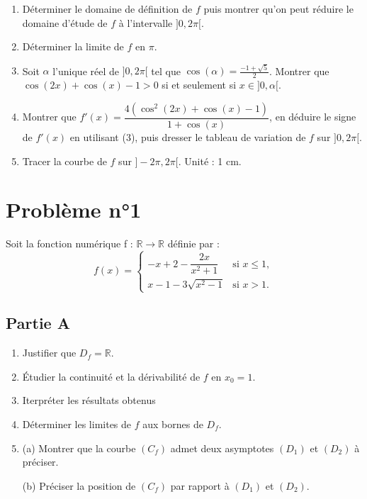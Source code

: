 \documentclass[12pt]{article}
\begin{document}
\begin{enumerate}
    \item Déterminer le domaine de définition de $f$ puis montrer qu’on peut réduire le domaine d’étude de $f$ à l’intervalle $]0, 2\pi[$.
    \item Déterminer la limite de $f$ en $\pi$.
    \item Soit $\alpha$ l’unique réel de $]0, 2\pi[$ tel que $\cos(\alpha) = \frac{-1 + \sqrt{5}}{2}$. Montrer que $\cos(2x) + \cos(x) - 1 > 0$ si et seulement si $x \in ]0, \alpha[$.
    \item Montrer que $f'(x) = \dfrac{4( \cos^2(2x) + \cos(x) - 1)}{1 + \cos(x)}$, en déduire le signe de $f'(x)$ en utilisant (3), puis dresser le tableau de variation de $f$ sur $]0, 2\pi[$.
    \item Tracer la courbe de $f$ sur $]-2\pi, 2\pi[$. Unité : 1 cm.
\end{enumerate}

\section*{Problème n°1}

Soit la fonction numérique  f : $\mathbb{R} \to \mathbb{R}$  définie par :
\[
f(x) =
\begin{cases}
-x + 2 - \dfrac{2x}{x^2 + 1} & \text{si } x \leq 1, \\
x - 1 - 3\sqrt{x^2 - 1} & \text{si } x > 1.
\end{cases}
\]

\subsection*{Partie A}

\begin{enumerate}
    \item Justifier que $D_f = \mathbb{R}$.
    \item Étudier la continuité et la dérivabilité de $f$ en $x_0 = 1$.
    \item Iterpréter les résultats obtenus
    \item Déterminer les limites de $f$ aux bornes de $D_f$.
    \item (a) Montrer que la courbe $(C_f)$ admet deux asymptotes $(D_1)$ et $(D_2)$ à préciser.
\end{enumerate}
\begin{enumerate}
    \item[(b)] Préciser la position de \( (C_f) \) par rapport à \( (D_1) \) et \( (D_2) \).
\end{enumerate}
\end{document}
